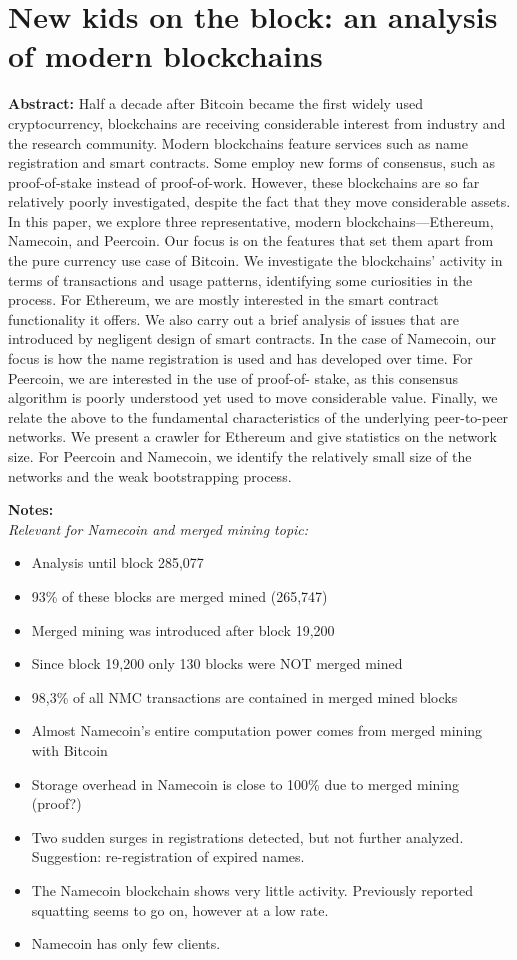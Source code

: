 \section{New kids on the block: an analysis of modern blockchains}

\textbf{Abstract:} 
Half a decade after Bitcoin became the first widely used
cryptocurrency, blockchains are receiving considerable interest from industry and the research community. Modern
blockchains feature services such as name registration and
smart contracts. Some employ new forms of consensus, such
as proof-of-stake instead of proof-of-work. However, these
blockchains are so far relatively poorly investigated, despite the fact that they move considerable assets. In this paper, we explore three representative, modern blockchains—Ethereum, Namecoin, and Peercoin. Our focus is on the features that set them apart from the pure currency use case of Bitcoin. 
We investigate the blockchains’ activity in terms of transactions and usage patterns, identifying some curiosities in the process. For Ethereum, we are mostly interested in the
smart contract functionality it offers. We also carry out a
brief analysis of issues that are introduced by negligent design of smart contracts. In the case of Namecoin, our focus
is how the name registration is used and has developed over
time. For Peercoin, we are interested in the use of proof-of-
stake, as this consensus algorithm is poorly understood
yet used to move considerable value. Finally, we relate the
above to the fundamental characteristics of the underlying
peer-to-peer networks. We present a crawler for Ethereum
and give statistics on the network size. For Peercoin and
Namecoin, we identify the relatively small size of the networks and the weak bootstrapping process.

\textbf{Notes:}\\
\emph{Relevant for Namecoin and merged mining topic:}
\begin{itemize}
\item Analysis until block 285,077
\item 93\% of these blocks are merged mined (265,747)
\item Merged mining was introduced after block 19,200
\item Since block 19,200 only 130 blocks were NOT merged mined
\item 98,3\% of all NMC transactions are contained in merged mined blocks
\item Almost Namecoin's entire computation power comes from merged mining with Bitcoin
\item Storage overhead in Namecoin is close to 100\% due to merged mining (proof?)
\item Two sudden surges in registrations detected, but not further analyzed. Suggestion: re-registration of expired names.
\item The Namecoin blockchain shows very little activity. Previously reported squatting seems to go on, however at a low rate. 
\item Namecoin has only few clients.
\end{itemize}

